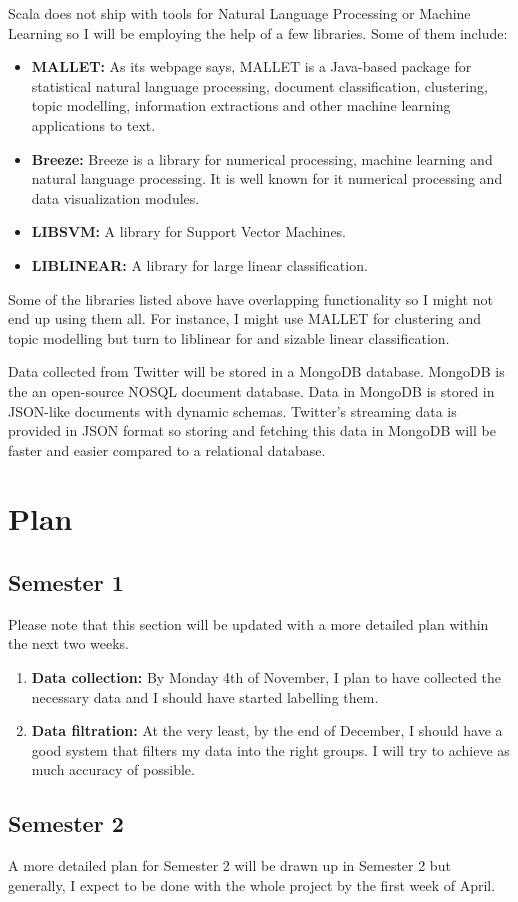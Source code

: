 \documentclass[12pt, a4paper]{article}
\begin{document}
Scala does not ship with tools for Natural Language Processing or Machine Learning so I will be
employing the help of a few libraries. Some of them include:
\begin{itemize}
  \item \textbf{MALLET:} As its webpage says, MALLET is a Java-based package for statistical natural
    language processing, document classification, clustering, topic modelling, information
    extractions and other machine learning applications to text.
  \item \textbf{Breeze:} Breeze is a library for numerical processing, machine learning and natural
    language processing. It is well known for it numerical processing and data visualization
    modules.
  \item \textbf{LIBSVM:} A library for Support Vector Machines.
  \item \textbf{LIBLINEAR:} A library for large linear classification.
\end{itemize}
Some of the libraries listed above have overlapping functionality so I might not end up using them
all. For instance, I might use MALLET for clustering and topic modelling but turn to liblinear for
and sizable linear classification.

Data collected from Twitter will be stored in a MongoDB database. MongoDB is the an open-source
NOSQL document database. Data in MongoDB is stored in JSON-like documents with dynamic schemas.
Twitter's streaming data is provided in JSON format so storing and fetching this data in MongoDB
will be faster and easier compared to a relational database.


\section{Plan}
\subsection{Semester 1}
Please note that this section will be updated with a more detailed plan within the next two weeks.
\begin{enumerate}
  \item \textbf{Data collection:} By Monday 4th of November, I plan to have collected the necessary
    data and I should have started labelling them.
  \item \textbf{Data filtration:} At the very least, by the end of December, I should have a good
    system that filters my data into the right groups. I will try to achieve as much accuracy of
    possible.

\end{enumerate}

\subsection{Semester 2}
A more detailed plan for Semester 2 will be drawn up in Semester 2 but generally, I expect to be
done with the whole project by the first week of April.
\end{document}
